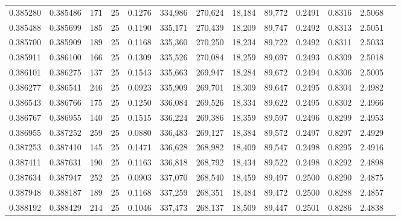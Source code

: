 \begin{tabular}{rrrrrrrrrrrrr}
0.385280 & 0.385486 &   171 &  25 &                                     0.1276 & 334,986 & 270,624 &  18,184 &  89,772 & 0.2491 & 0.8316 & 2.5068 \\
0.385488 & 0.385699 &   185 &  25 &                                     0.1190 & 335,171 & 270,439 &  18,209 &  89,747 & 0.2492 & 0.8313 & 2.5051 \\
0.385700 & 0.385909 &   189 &  25 &                                     0.1168 & 335,360 & 270,250 &  18,234 &  89,722 & 0.2492 & 0.8311 & 2.5033 \\
0.385911 & 0.386100 &   166 &  25 &                                     0.1309 & 335,526 & 270,084 &  18,259 &  89,697 & 0.2493 & 0.8309 & 2.5018 \\
0.386101 & 0.386275 &   137 &  25 &                                     0.1543 & 335,663 & 269,947 &  18,284 &  89,672 & 0.2494 & 0.8306 & 2.5005 \\
0.386277 & 0.386541 &   246 &  25 &                                     0.0923 & 335,909 & 269,701 &  18,309 &  89,647 & 0.2495 & 0.8304 & 2.4982 \\
0.386543 & 0.386766 &   175 &  25 &                                     0.1250 & 336,084 & 269,526 &  18,334 &  89,622 & 0.2495 & 0.8302 & 2.4966 \\
0.386767 & 0.386955 &   140 &  25 &                                     0.1515 & 336,224 & 269,386 &  18,359 &  89,597 & 0.2496 & 0.8299 & 2.4953 \\
0.386955 & 0.387252 &   259 &  25 &                                     0.0880 & 336,483 & 269,127 &  18,384 &  89,572 & 0.2497 & 0.8297 & 2.4929 \\
0.387253 & 0.387410 &   145 &  25 &                                     0.1471 & 336,628 & 268,982 &  18,409 &  89,547 & 0.2498 & 0.8295 & 2.4916 \\
0.387411 & 0.387631 &   190 &  25 &                                     0.1163 & 336,818 & 268,792 &  18,434 &  89,522 & 0.2498 & 0.8292 & 2.4898 \\
0.387634 & 0.387947 &   252 &  25 &                                     0.0903 & 337,070 & 268,540 &  18,459 &  89,497 & 0.2500 & 0.8290 & 2.4875 \\
0.387948 & 0.388187 &   189 &  25 &                                     0.1168 & 337,259 & 268,351 &  18,484 &  89,472 & 0.2500 & 0.8288 & 2.4857 \\
0.388192 & 0.388429 &   214 &  25 &                                     0.1046 & 337,473 & 268,137 &  18,509 &  89,447 & 0.2501 & 0.8286 & 2.4838 \\

\end{tabular}
